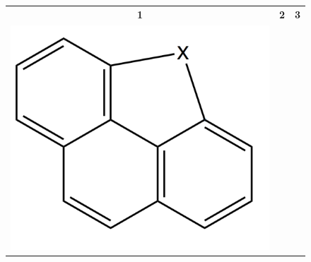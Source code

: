 \begin{figure}[H]
\begin{center}
\begin{tabular}{c c c}
				\textbf{1} & \textbf{2}& \textbf{3}\\
				\includegraphics[scale=0.12]{image/tribenzo-lajolie} & 

\end{tabular}
\end{center}
\end{figure}
